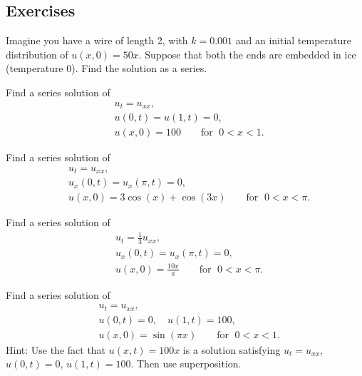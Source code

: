 \subsection{Exercises}

\begin{exercise}
Imagine you have a wire of length 2, with $k=0.001$ and an initial
temperature distribution of $u(x,0) = 50 x$.  Suppose that both the ends
are embedded in ice (temperature 0).  Find the solution as a series.
\end{exercise}

\begin{exercise}
Find a series solution of
\begin{align*}
& u_t =  u_{xx} , \\
& u(0,t) = u(1,t) = 0 , \\
& u(x,0) = 100 \qquad \text{for } \; 0 < x < 1 .
\end{align*}
\end{exercise}

\begin{exercise}
Find a series solution of
\begin{align*}
& u_t =  u_{xx} , \\
& u_x(0,t) = u_x(\pi,t) = 0 , \\
& u(x,0) = 3\cos (x) + \cos (3x) \qquad \text{for } \; 0 < x < \pi .
\end{align*}
\end{exercise}

\begin{exercise} \label{heat:cosexr}
Find a series solution of
\begin{align*}
& u_t = \frac{1}{3} u_{xx} , \\
& u_x(0,t) = u_x(\pi,t) = 0 , \\
& u(x,0) = \frac{10x}{\pi} \qquad \text{for } \; 0 < x < \pi .
\end{align*}
\end{exercise}

\begin{exercise} \label{heat:oneto100exr}
Find a series solution of
\begin{align*}
& u_t =  u_{xx} , \\
& u(0,t) = 0 , \quad u(1,t) = 100 , \\
& u(x,0) = \sin (\pi x) \qquad \text{for } \; 0 < x < 1 .
\end{align*}
Hint: Use the fact that $u(x,t) = 100 x$ is a solution satisfying
$u_t = u_{xx}$, $u(0,t) = 0$, $u(1,t) = 100$.  Then use superposition.
\end{exercise}

